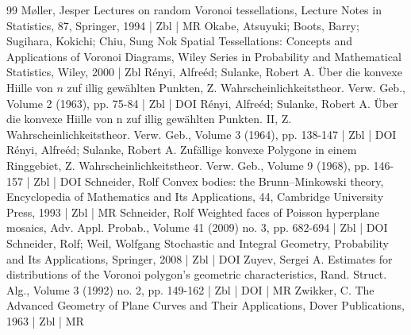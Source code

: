 \documentclass[10pt]{amsart}
\theoremstyle{definition}\newtheorem{defi}[theo]{Definition}\newtheorem{rema}[theo]{Remark}\newtheorem{exam}[theo]{Example}\newtheorem{exem}[theo]{Example}\newtheorem{nota}[theo]{Notation}
\begin{document}
\begin{thebibliography}{99}
Møller, Jesper Lectures on random Voronoi tessellations, Lecture Notes in Statistics, 87, Springer, 1994 | Zbl | MR
Okabe, Atsuyuki; Boots, Barry; Sugihara, Kokichi; Chiu, Sung Nok Spatial Tessellations: Concepts and Applications of Voronoi Diagrams, Wiley Series in Probability and Mathematical Statistics, Wiley, 2000 | Zbl
Rényi, Alfreéd; Sulanke, Robert A. Über die konvexe Hiille von $n$ zuf illig gewählten Punkten, Z. Wahrscheinlichkeitstheor. Verw. Geb., Volume 2 (1963), pp. 75-84 | Zbl | DOI
Rényi, Alfreéd; Sulanke, Robert A. Über die konvexe Hiille von n zuf illig gewählten Punkten. II, Z. Wahrscheinlichkeitstheor. Verw. Geb., Volume 3 (1964), pp. 138-147 | Zbl | DOI
Rényi, Alfreéd; Sulanke, Robert A. Zufällige konvexe Polygone in einem Ringgebiet, Z. Wahrscheinlichkeitstheor. Verw. Geb., Volume 9 (1968), pp. 146-157 | Zbl | DOI
Schneider, Rolf Convex bodies: the Brunn–Minkowski theory, Encyclopedia of Mathematics and Its Applications, 44, Cambridge University Press, 1993 | Zbl | MR
Schneider, Rolf Weighted faces of Poisson hyperplane mosaics, Adv. Appl. Probab., Volume 41 (2009) no. 3, pp. 682-694 | Zbl | DOI
Schneider, Rolf; Weil, Wolfgang Stochastic and Integral Geometry, Probability and Its Applications, Springer, 2008 | Zbl | DOI
Zuyev, Sergei A. Estimates for distributions of the Voronoi polygon’s geometric characteristics, Rand. Struct. Alg., Volume 3 (1992) no. 2, pp. 149-162 | Zbl | DOI | MR
Zwikker, C. The Advanced Geometry of Plane Curves and Their Applications, Dover Publications, 1963 | Zbl | MR
\end{thebibliography}
\end{document}
